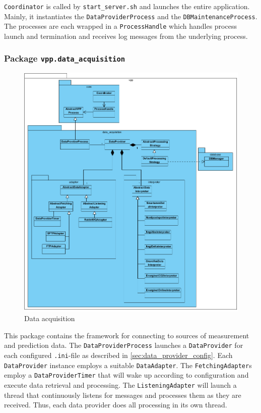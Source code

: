 \texttt{Coordinator} is called by \texttt{start\_server.sh} and launches the entire application. Mainly, it instantiates the \texttt{DataProviderProcess} and the \texttt{DBMaintenanceProcess}. The processes are each wrapped in a \texttt{ProcessHandle} which handles process launch and termination and receives log messages from the underlying process.


\subsubsection{Package \texttt{vpp.data\_acquisition}}

\begin{figure}[H]
    \centering
    \includegraphics[width=\textwidth]{figures/class_data_acquisition}
    \caption{Data acquisition}
\end{figure}

This package contains the framework for connecting to sources of measurement and prediction data. The \texttt{DataProviderProcess} launches a \texttt{DataProvider} for each configured \texttt{.ini}-file as described in \ref{sec:data_provider_config}. Each \texttt{DataProvider} instance employs a suitable \texttt{DataAdapter}. The \texttt{FetchingAdapter}s employ a \texttt{DataProviderTimer} that will wake up according to configuration and execute data retrieval and processing. The \texttt{ListeningAdapter} will launch a thread that continuously listens for messages and processes them as they are received. Thus, each data provider does all processing in its own thread.

